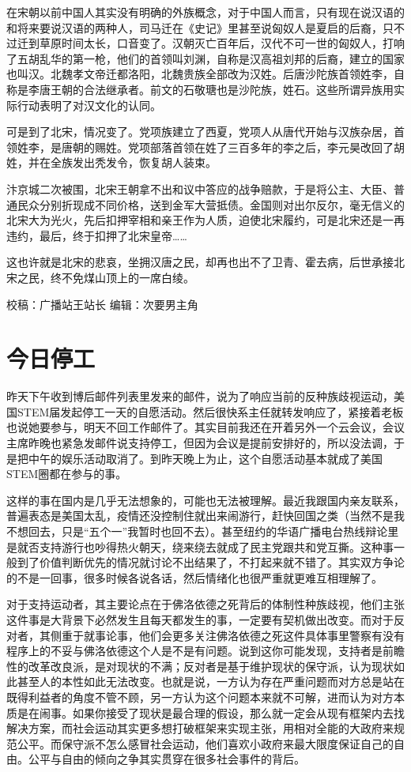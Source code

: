 \documentclass[
]{book}
\begin{document}
在宋朝以前中国人其实没有明确的外族概念，对于中国人而言，只有现在说汉语的和将来要说汉语的两种人，司马迁在《史记》里甚至说匈奴人是夏启的后裔，只不过迁到草原时间太长，口音变了。汉朝灭亡百年后，汉代不可一世的匈奴人，打响了五胡乱华的第一枪，他们的首领叫刘渊，自称是汉高祖刘邦的后裔，建立的国家也叫汉。北魏孝文帝迁都洛阳，北魏贵族全部改为汉姓。后唐沙陀族首领姓李，自称是李唐王朝的合法继承者。前文的石敬瑭也是沙陀族，姓石。这些所谓异族用实际行动表明了对汉文化的认同。

可是到了北宋，情况变了。党项族建立了西夏，党项人从唐代开始与汉族杂居，首领姓李，是唐朝的赐姓。党项部落首领在姓了三百多年的李之后，李元昊改回了胡姓，并在全族发出秃发令，恢复胡人装束。

汴京城二次被围，北宋王朝拿不出和议中答应的战争赔款，于是将公主、大臣、普通民众分别折现成不同价格，送到金军大营抵债。金国则对出尔反尔，毫无信义的北宋大为光火，先后扣押宰相和亲王作为人质，迫使北宋履约，可是北宋还是一再违约，最后，终于扣押了北宋皇帝\ldots\ldots{}

这也许就是北宋的悲哀，坐拥汉唐之民，却再也出不了卫青、霍去病，后世承接北宋之民，终不免煤山顶上的一席白绫。

校稿：广播站王站长
编辑：次要男主角

\hypertarget{ux4ecaux65e5ux505cux5de5}{%
\section{今日停工}\label{ux4ecaux65e5ux505cux5de5}}

昨天下午收到博后邮件列表里发来的邮件，说为了响应当前的反种族歧视运动，美国STEM届发起停工一天的自愿活动。然后很快系主任就转发响应了，紧接着老板也说她要参与，明天不回工作邮件了。其实目前我还在开着另外一个云会议，会议主席昨晚也紧急发邮件说支持停工，但因为会议是提前安排好的，所以没法调，于是把中午的娱乐活动取消了。到昨天晚上为止，这个自愿活动基本就成了美国STEM圈都在参与的事。

这样的事在国内是几乎无法想象的，可能也无法被理解。最近我跟国内亲友联系，普遍表态是美国太乱，疫情还没控制住就出来闹游行，赶快回国之类（当然不是我不想回去，只是``五个一''我暂时也回不去）。甚至纽约的华语广播电台热线辩论里是就否支持游行也吵得热火朝天，绕来绕去就成了民主党跟共和党互撕。这种事一般到了价值判断优先的情况就讨论不出结果了，不打起来就不错了。其实双方争论的不是一回事，很多时候各说各话，然后情绪化也很严重就更难互相理解了。

对于支持运动者，其主要论点在于佛洛依德之死背后的体制性种族歧视，他们主张这件事是大背景下必然发生且每天都发生的事，一定要有契机做出改变。而对于反对者，其侧重于就事论事，他们会更多关注佛洛依德之死这件具体事里警察有没有程序上的不妥与佛洛依德这个人是不是有问题。说到这你可能发现，支持者是前瞻性的改革改良派，是对现状的不满；反对者是基于维护现状的保守派，认为现状如此甚至人的本性如此无法改变。也就是说，一方认为存在严重问题而对方总是站在既得利益者的角度不管不顾，另一方认为这个问题本来就不可解，进而认为对方本质是在闹事。如果你接受了现状是最合理的假设，那么就一定会从现有框架内去找解决方案，而社会运动其实更多想打破框架来实现主张，用相对全能的大政府来规范公平。而保守派不怎么感冒社会运动，他们喜欢小政府来最大限度保证自己的自由。公平与自由的倾向之争其实贯穿在很多社会事件的背后。
\end{document}

